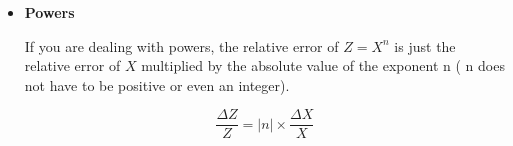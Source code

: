 \documentclass[a4paper,10pt]{article}
\begin{document}
\begin{itemize}
  \item \textbf{Powers}
  
  If you are dealing with powers, the relative error of $Z = X^n$ is just the relative error of $X$ multiplied by the absolute value of the
  exponent n ( n does not have to
  be positive or even an integer).
  
  \[
   \frac{\Delta Z}{Z} = |n| \times \frac{\Delta X}{X}
  \]

  

  
  
\end{itemize}
\end{document}
